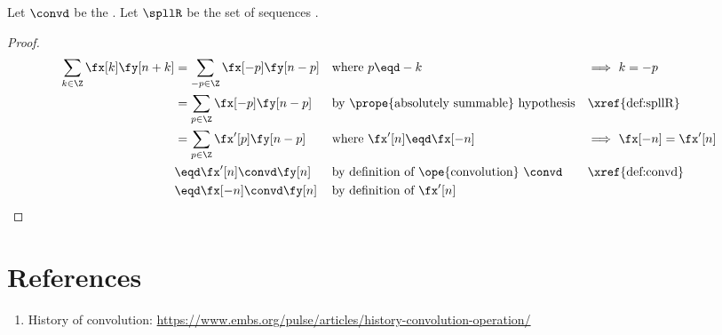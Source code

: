 \begin{proposition}
\label{prop:conv_knk}
Let $\convd$ be the  .
Let $\spllR$ be the set of  sequences .
\end{proposition}
\begin{proof}
\begin{align*}
  \sum_{k\in\Z} \fx[k]\fy[n+k]
    &= \sum_{-p\in\Z} \fx[-p]\fy[n-p]
    && \text{where $p\eqd -k$}
    && \text{$\implies$ $k=-p$}
  \\&= \sum_{p\in\Z} \fx[-p]\fy[n-p]
    && \text{by \prope{absolutely summable} hypothesis}
    && \text{\xref{def:spllR}}
  \\&= \sum_{p\in\Z} \fx'[p]\fy[n-p]
    && \text{where $\fx'[n] \eqd\fx[-n]$}
    && \text{$\implies$ $\fx[-n]=\fx'[n]$}
  \\&\eqd \fx'[n]\convd\fy[n]
    && \text{by definition of \ope{convolution} $\convd$}
    && \text{\xref{def:convd}}
  \\&\eqd \fx[-n]\convd\fy[n]
    && \text{by definition of $\fx'[n]$}
\end{align*}
\end{proof}


\section{References}
\begin{enumerate}
  \item History of convolution: \url{https://www.embs.org/pulse/articles/history-convolution-operation/}
\end{enumerate}

